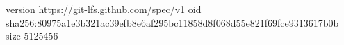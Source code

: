 version https://git-lfs.github.com/spec/v1
oid sha256:80975a1e3b321ac39efb8e6af295bc11858d8f068d55e821f69fce9313617b0b
size 5125456
